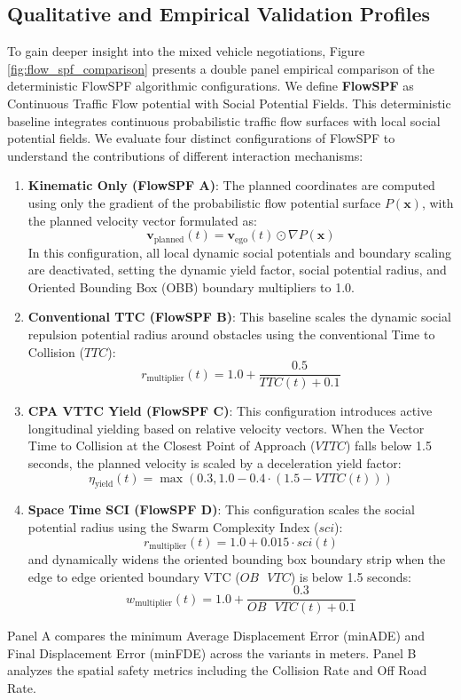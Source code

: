 \documentclass{article}
\begin{document}
\subsection{Qualitative and Empirical Validation Profiles}
To gain deeper insight into the mixed vehicle negotiations, Figure \ref{fig:flow_spf_comparison} presents a double panel empirical comparison of the deterministic FlowSPF algorithmic configurations. We define \textbf{FlowSPF} as Continuous Traffic Flow potential with Social Potential Fields. This deterministic baseline integrates continuous probabilistic traffic flow surfaces with local social potential fields. We evaluate four distinct configurations of FlowSPF to understand the contributions of different interaction mechanisms:
\begin{enumerate}
\item \textbf{Kinematic Only (FlowSPF A)}: The planned coordinates are computed using only the gradient of the probabilistic flow potential surface $P(\mathbf{x})$, with the planned velocity vector formulated as:
\begin{equation}
\mathbf{v}_{\text{planned}}(t) = \mathbf{v}_{\text{ego}}(t) \odot \nabla P(\mathbf{x})
\end{equation}
In this configuration, all local dynamic social potentials and boundary scaling are deactivated, setting the dynamic yield factor, social potential radius, and Oriented Bounding Box (OBB) boundary multipliers to 1.0.
\item \textbf{Conventional TTC (FlowSPF B)}: This baseline scales the dynamic social repulsion potential radius around obstacles using the conventional Time to Collision ($TTC$):
\begin{equation}
r_{\text{multiplier}}(t) = 1.0 + \frac{0.5}{TTC(t) + 0.1}
\end{equation}
\item \textbf{CPA VTTC Yield (FlowSPF C)}: This configuration introduces active longitudinal yielding based on relative velocity vectors. When the Vector Time to Collision at the Closest Point of Approach ($VTTC$) falls below 1.5 seconds, the planned velocity is scaled by a deceleration yield factor:
\begin{equation}
\eta_{\text{yield}}(t) = \max\left(0.3, 1.0 - 0.4 \cdot (1.5 - VTTC(t))\right)
\end{equation}
\item \textbf{Space Time SCI (FlowSPF D)}: This configuration scales the social potential radius using the Swarm Complexity Index ($sci$):
\begin{equation}
r_{\text{multiplier}}(t) = 1.0 + 0.015 \cdot sci(t)
\end{equation}
and dynamically widens the oriented bounding box boundary strip when the edge to edge oriented boundary VTC ($OB\text{ }VTC$) is below 1.5 seconds:
\begin{equation}
w_{\text{multiplier}}(t) = 1.0 + \frac{0.3}{OB\text{ }VTC(t) + 0.1}
\end{equation}
\end{enumerate}
Panel A compares the minimum Average Displacement Error (minADE) and Final Displacement Error (minFDE) across the variants in meters. Panel B analyzes the spatial safety metrics including the Collision Rate and Off Road Rate.
\end{document}
